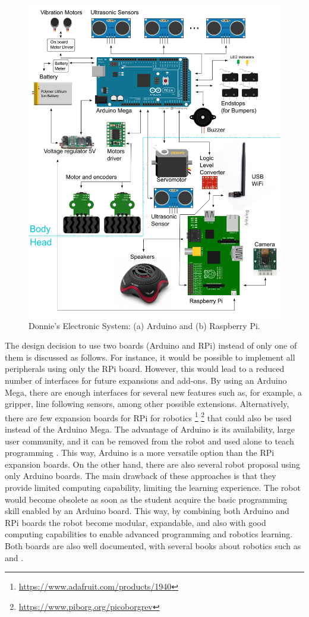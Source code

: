\begin{figure}[h!]
  \centering
    \includegraphics[width=0.95\linewidth]{figs/donnie-elet.png}
  \caption{Donnie's Electronic System: (a) Arduino and (b) Raspberry Pi.}
  \label{fig:donnie-elet}
\end{figure}

The design decision to use two boards (Arduino and RPi) instead of only one of them is discussed as follows. For instance, it would be possible to implement all peripherals using only the RPi board. However, this would lead to a reduced number of interfaces for future expansions and add-ons. By using an Arduino Mega, there are enough interfaces for several new features such as, for example, a gripper, line following sensors, among other possible extensions. Alternatively, there are few expansion boards for RPi for robotics \footnote{\url{https://www.adafruit.com/products/1940}} \footnote{\url{https://www.piborg.org/picoborgrev}} that could also be used instead of the Arduino Mega. The advantage of Arduino is its availability, large user community, and it can be removed from the robot and used alone to teach programming \cite{ardu-book1,ardu-book2}. This way, Arduino is a more versatile option than the RPi expansion boards. On the other hand, there are also several robot proposal using only Arduino boards. The main drawback of these approaches is that they provide limited computing capability, limiting the learning experience. The robot would become obsolete as soon as the student acquire the basic programming skill enabled by an Arduino board. This way, by combining both Arduino and RPi boards the robot become modular, expandable, and also with good computing capabilities to enable advanced programming and robotics learning. Both boards are also well documented, with several books about robotics such as \cite{rpi-book1,rpi-book2,rpi-book3} and \cite{ardu-book1, ardu-book2}.

